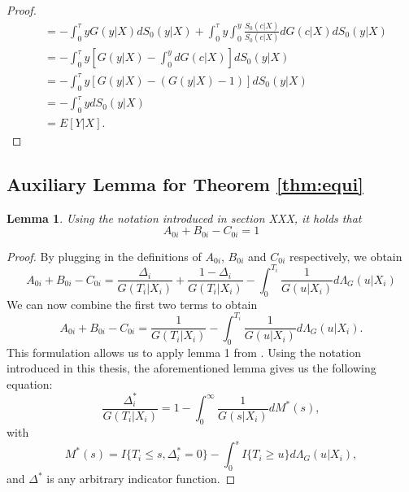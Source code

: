 \documentclass[12pt, a4paper]{scrartcl}
\theoremstyle{definition}
\theoremstyle{plain}
\newtheorem{Lemma}{Lemma}[section]
\numberwithin{equation}{section}
\numberwithin{figure}{section}
\numberwithin{table}{section}
\begin{document}
\begin{appendices}
\begin{proof}
\begin{equation*}
\begin{split}
			&= - \int_{0}^{\tau} y G(y\vert X)dS_0(y\vert X) + \int_0^{\tau}y\int_0^y \frac{S_0(c\vert X)}{S_0(c\vert X)} dG(c\vert X)dS_0(y\vert X)\\
			&= - \int_{0}^{\tau} y \left[G(y\vert X)-\int_0^ydG(c\vert X)\right]dS_0(y\vert X)\\
			&= - \int_{0}^{\tau} y \left[G(y\vert X)-(G(y\vert X)-1)\right]dS_0(y\vert X)\\
			&= - \int_{0}^{\tau} ydS_0(y\vert X)\\
			&= E[Y\vert X].
			\end{split}
			\end{equation*}
		\end{proof}
		\subsection{Auxiliary Lemma for Theorem \ref{thm:equi}}\label{proof:strawderman}
		
		\begin{Lemma}\label{lem:equi}
			Using the notation introduced in section XXX, it holds that 
			\begin{equation*}
				A_{0i}+B_{0i}-C_{0i}=1
			\end{equation*}
		\end{Lemma}
		\begin{proof}
			By plugging in the definitions of $A_{0i}$, $B_{0i}$ and $C_{0i}$ respectively, we obtain
			\begin{equation*}
			A_{0i}+B_{0i}-C_{0i} = \frac{\Delta_i}{G(T_i\vert X_i)} + \frac{1-\Delta_i}{G(T_i\vert X_i)} - \int_{0}^{T_i}\frac{1}{G(u\vert X_i)}d\Lambda_G(u\vert X_i)
			\end{equation*}
			We can now combine the first two terms to obtain
			\begin{equation}\label{eq:lemma}
			A_{0i}+B_{0i}-C_{0i} = \frac{1}{G(T_i \vert X_i)} - \int_{0}^{T_i}\frac{1}{G(u\vert X_i)}d\Lambda_G(u\vert X_i).
			\end{equation}
			This formulation allows us to apply lemma 1 from \citet*{strawderman}.
			Using the notation introduced in this thesis, the aforementioned lemma gives us the following equation:
			\begin{equation}\label{eq:straw}
			\frac{\Delta^*_i}{G(T_i\vert X_i)} = 1 - \int_{0}^{\infty} \frac{1}{G(s\vert X_i)} dM^*(s),
			\end{equation}
			with
			\begin{equation*}
			M^*(s) = I\{T_i \leq s, \Delta^*_i=0\} - \int_{0}^s I\{T_i\geq u\}d\Lambda_G(u\vert X_i),
			\end{equation*}
			and $\Delta^*$ is any arbitrary indicator function.
			

\end{proof}
\end{appendices}
\end{document}
